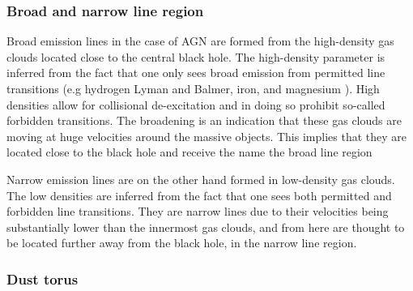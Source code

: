 



\subsubsection{Broad and narrow line region}

Broad emission lines in the case of AGN are formed from the high-density gas clouds located close to the central black hole. The 
high-density parameter is inferred from the fact that one only sees broad emission from permitted line transitions (e.g hydrogen Lyman and Balmer,
iron, and magnesium ). High densities allow for collisional de-excitation and in doing so prohibit so-called forbidden transitions.
The broadening is an indication that these gas clouds are moving at huge velocities around the massive objects. This implies that they are located close to the black hole and receive the name the broad line region

Narrow emission lines are on the other hand formed in low-density gas clouds. The low densities are inferred from the fact that one sees
both permitted and forbidden line transitions. They are narrow lines due to their velocities being substantially lower than the innermost gas clouds, and from here are thought to be located further away from the black hole, in the narrow line region. 


\subsubsection{Dust torus}

